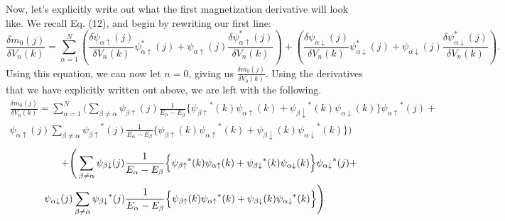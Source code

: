 \documentclass[10pt]{revtex4-1}
\newcommand{\ua}{\uparrow}
\newcommand{\da}{\downarrow}
\newcommand{\paup}{{\psi_{\alpha \ua}}}
\newcommand{\padn}{{\psi_{\alpha \da}}}
\newcommand{\pbup}{{\psi_{\beta \ua}}}
\newcommand{\pbdn}{{\psi_{\beta \da}}}
\begin{document}
Now, let's explicitly write out what the first magnetization derivative will look like.
We recall Eq. (12), and begin by rewriting our first line:
\begin{equation*}
  \frac{\delta m_0(j)}{\delta V_n(k)} = \sum_{\alpha = 1}^N
  \left(\frac{\delta \psi_{\alpha \ua}(j)}{\delta V_n(k)} \psi_{\alpha \ua}^*(j) + \psi_{\alpha \ua}(j) \frac{\delta \psi_{\alpha \ua}^*(j)}{\delta V_n(k)}\right) + \left(\frac{\delta \psi_{\alpha \da}(j)}{\delta V_n(k)} \psi_{\alpha \da}^*(j) + \psi_{\alpha \da}(j) \frac{\delta \psi_{\alpha \da}^*(j)}{\delta V_n(k)}\right) .
\end{equation*}
Using this equation, we can now let $n=0$, giving us $\frac{\delta m_0(j)}{\delta V_0(k)}$.
Using the derivatives that we have explicitly written out above, we are left with the following.
\begin{multline*}
  \frac{\delta m_0(j)}{\delta V_n(k)}= \sum_{\alpha = 1}^N
  \Bigg( \sum_{\beta \neq \alpha} \pbup(j) \frac{1}{E_{\alpha}-E_{\beta}} \Big\{ \pbup^*(k) \paup(k) + \pbdn^*(k) \padn(k) \Big\} \paup^*(j) + \\
  \paup(j) \sum_{\beta \neq \alpha} \pbup^*(j) \frac{1}{E_{\alpha}-E_{\beta}} \Big\{ \pbup(k) \paup^*(k) + \pbdn(k) \padn^*(k) \Big\} \Bigg)
\end{multline*}
\begin{multline*}
  \hspace{1.75cm}
  + \Bigg( \sum_{\beta \neq \alpha} \pbdn(j) \frac{1}{E_{\alpha}-E_{\beta}} \Big\{ \pbup^*(k) \paup(k) + \pbdn^*(k) \padn(k) \Big\} \padn^*(j) +
  \\
  \padn(j) \sum_{\beta \neq \alpha}\pbdn^*(j) \frac{1}{E_{\alpha}-E_{\beta}} \Big\{ \pbup(k) \paup^*(k) + \pbdn(k) \padn^*(k) \Big\} \Bigg)
\end{multline*}
%
%
\end{document}
